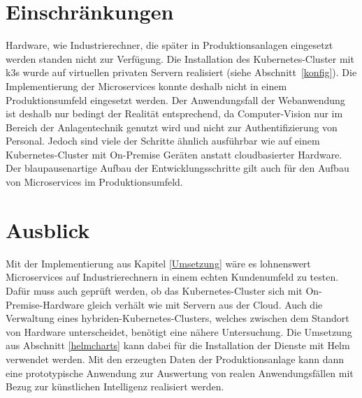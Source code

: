 \newpage
\section{Einschränkungen}\label{Einschraenkungen}
Hardware, wie Industrierechner, die später in Produktionsanlagen eingesetzt werden standen nicht zur Verfügung.
Die Installation des Kubernetes-Cluster mit k3s wurde auf virtuellen privaten Servern realisiert (siehe Abschnitt~\ref{konfig}).
Die Implementierung der Microservices konnte deshalb nicht in einem Produktionsumfeld eingesetzt werden.
Der Anwendungsfall der Webanwendung ist deshalb nur bedingt der Realität entsprechend, da Computer-Vision nur im Bereich der Anlagentechnik genutzt wird und nicht zur Authentifizierung von Personal.
Jedoch sind viele der Schritte ähnlich ausführbar wie auf einem Kubernetes-Cluster mit On-Premise Geräten anstatt cloudbasierter Hardware.
Der blaupausenartige Aufbau der Entwicklungsschritte gilt auch für den Aufbau von Microservices im Produktionsumfeld.

\section{Ausblick}
Mit der Implementierung aus Kapitel \ref{Umsetzung} wäre es lohnenswert Microservices auf Industrierechnern in einem echten Kundenumfeld zu testen.
Dafür muss auch geprüft werden, ob das Kubernetes-Cluster sich mit On-Premise-Hardware gleich verhält wie mit Servern aus der Cloud.
Auch die Verwaltung eines hybriden-Kubernetes-Clusters, welches zwischen dem Standort von Hardware unterscheidet, benötigt eine nähere Untersuchung.
Die Umsetzung aus Abschnitt \ref{helmcharts} kann dabei für die Installation der Dienste mit Helm verwendet werden.
Mit den erzeugten Daten der Produktionsanlage kann dann eine prototypische Anwendung zur Auswertung von realen Anwendungsfällen mit Bezug zur künstlichen Intelligenz realisiert werden.
